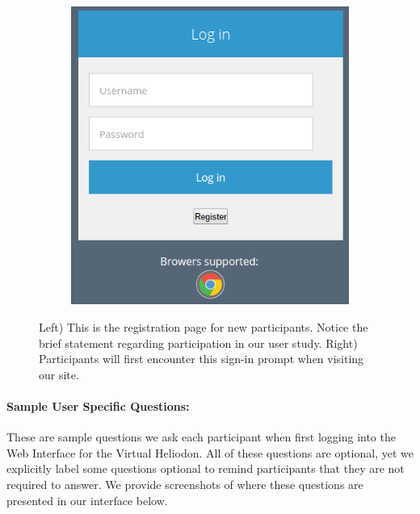 \documentclass[12pt]{article}
\begin{document}
\begin{figure}[h]
\begin{subfigure}{.5\textwidth}
  \end{subfigure}%
  \begin{subfigure}{.5\textwidth}
    \centering
    \includegraphics[scale=0.4]{ss_sign}
  \end{subfigure}
\caption{Left) This is the registration page for new participants. Notice the brief statement regarding participation in our user study. Right) Participants will first encounter this sign-in prompt when visiting our site.}  

\label{fig:registration}
\end{figure}

\newpage
\paragraph{Sample User Specific Questions:}
These are sample questions we ask each participant when first logging into the Web Interface for the Virtual Heliodon.
All of these questions are optional, yet we explicitly label some questions optional to remind participants that they are not required to answer. 
We provide screenshots of where these questions are presented in our interface below.
\end{document}
